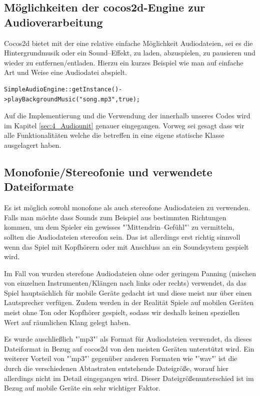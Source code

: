 \subsection{Möglichkeiten der cocos2d-Engine zur Audioverarbeitung}
Cocos2d bietet mit der  eine relative einfache Möglichkeit Audio\-dateien, sei es die Hintergrundmusik oder ein Sound--Effekt, zu laden, abzuspielen, zu pausieren und wieder zu entfernen/entladen. Hierzu ein kurzes Beispiel wie man auf einfache Art und Weise eine Audiodatei abspielt.

\begin{lstlisting}[style=singleline]
SimpleAudioEngine::getInstance()->playBackgroundMusic("song.mp3",true);
\end{lstlisting}

Auf die Implementierung und die Verwendung der  innerhalb unseres Codes wird im Kapitel \ref{sec:4_Audiounit} genauer eingegangen. Vorweg sei gesagt dass wir alle Funktionalitäten welche die  betreffen in eine eigene statische Klasse  ausgelagert haben.


\subsection{Monofonie/Stereofonie und verwendete Dateiformate}
Es ist möglich sowohl monofone als auch stereofone Audiodateien zu verwenden. Falls man möchte dass Sounds zum Beispiel aus bestimmten Richtungen kommen, um dem Spieler ein gewisses "'Mittendrin--Gefühl"' zu vermitteln, sollten die Audiodateien stereofon sein. Das ist allerdings erst richtig sinnvoll wenn das Spiel mit Kopfhörern oder mit Anschluss an ein Soundsystem gespielt wird. 

Im Fall von \gamename wurden sterefone Audiodateien ohne oder geringem Panning (mischen von einzelnen Instrumenten/Klängen nach links oder rechts) verwendet, da das Spiel hauptsächlich für mobile Geräte gedacht ist und diese meist nur über einen Lautsprecher verfügen. Zudem werden in der Realität Spiele auf mobilen Geräten meist ohne Ton oder Kopfhörer gespielt, sodass wir deshalb keinen speziellen Wert auf räumlichen Klang gelegt haben.

Es wurde auschließlich "'mp3"' als Format für Audiodateien verwendet, da dieses Dateiformat in Bezug auf cocos2d von den meisten Geräten unterstützt wird. Ein weiterer Vorteil von "'mp3"' gegenüber anderen Formaten wie "'wav"' ist die durch die verschiedenen Abtastraten entstehende Dateigröße, worauf hier allerdings nicht im Detail eingegangen wird. Dieser Dateigrößenunterschied ist im Bezug auf mobile Geräte ein sehr wichtiger Faktor.

